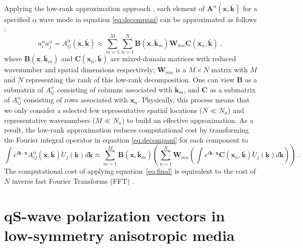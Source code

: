 Applying the low-rank approximation approach \cite[]{fomellr}, each element of $\mathbf{A}^{\alpha}(\mathbf{x},\mathbf{\bar{k}})$ for a specified $\alpha$ wave mode in equation \ref{eq:decompani}  can be approximated as follows \cite[]{chengfomel}: 
\begin{equation}
\label{eq:lr}
a^{\alpha}_i a^{\alpha}_j = A^{\alpha}_{ij}(\mathbf{x},\mathbf{\bar{k}}) \approx \sum_{m=1}^M \sum_{n=1}^{N} \mathbf{B}(\mathbf{x},\mathbf{\bar{k}}_m)\mathbf{W}_{mn}\mathbf{C}(\mathbf{x}_n,\mathbf{\bar{k}})~,
\end{equation}
where $\mathbf{B}(\mathbf{x},\mathbf{\bar{k}}_m)$
and $\mathbf{C}(\mathbf{x}_n,\mathbf{\bar{k}})$ are mixed-domain matrices with reduced wavenumber and spatial dimensions respectively; $\mathbf{W}_{mn}$ is a $M\times N$ matrix with 
$M$ and $N$ representing the rank of this low-rank decomposition. 
One can view $\mathbf{B}$ as a submatrix of $A^{\alpha}_{ij}$ consisting of columns associated with ${\mathbf{\bar{k}}_m}$, and $\mathbf{C}$ as a submatrix of $A^{\alpha}_{ij}$ consisting of rows associated with ${\mathbf{x}_n}$. Physically, this process means that we only consider a selected few representative spatial locations ($N \ll N_x$) and representative wavenumbers ($M \ll N_x$) to build an effective approximation. 
As a result, the low-rank approximation reduces computational cost by transforming the Fourier integral operator in equation \ref{eq:decompani} for each component  to
\begin{equation}
\label{eq:final}
	\int e^{i\mathbf{k}\cdot\mathbf{x}}A^{\alpha}_{ij}(\mathbf{x},\mathbf{\bar{k}})\widetilde{U}_j(\mathbf{k})d\mathbf{k} \approx \sum_{m=1}^{M}\mathbf{B}(\mathbf{x},\mathbf{\bar{k}}_m)\left(\sum_{n=1}^{N}\mathbf{W}_{mn}\left(\int e^{i\mathbf{k}\cdot\mathbf{x}}\mathbf{C}(\mathbf{x}_n,\mathbf{\bar{k}})\widetilde{U}_j(\mathbf{k})d\mathbf{k}\right)\right)~.
\end{equation}
The computational cost of applying equation~\ref{eq:final} is equivalent to the cost of $N$ inverse fast Fourier Transforms (FFT) \cite[]{chengfomel}. 


\section{\MakeLowercase{q}S-wave polarization vectors in  low-symmetry anisotropic media}

